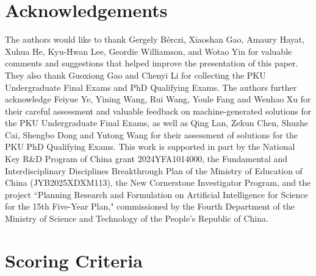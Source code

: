 \documentclass[11pt]{article}
\numberwithin{equation}{section}
\begin{document}
\section*{Acknowledgements}

The authors would like to thank Gergely Bérczi, Xiaoshan Gao, Amaury Hayat, Xuhua He, Kyu-Hwan Lee, Geordie Williamson, and Wotao Yin for valuable comments and suggestions that helped improve the presentation of this paper. They also thank Guoxiong Gao and Chenyi Li for collecting the PKU Undergraduate Final Exams and PhD Qualifying Exams. The authors further acknowledge Feiyue Ye, Yining Wang, Rui Wang, Youle Fang and Wenhao Xu for their careful assessment and valuable feedback on machine-generated solutions for the PKU Undergraduate Final Exams, as well as Qing Lan, Zekun Chen, Shuzhe Cai, Shengbo Dong and Yutong Wang for their assessment of solutions for the PKU PhD Qualifying Exams. This work is supported in part by the National Key R\&D Program of China grant 2024YFA1014000, the Fundamental and Interdisciplinary Disciplines Breakthrough Plan of the Ministry of Education of China (JYB2025XDXM113), the New Cornerstone Investigator Program, and the project ``Planning Research and Formulation on Artificial Intelligence for Science for the 15th Five-Year Plan," commissioned by the Fourth Department of the Ministry of Science and Technology of the People's Republic of China.









\newpage
\appendix

\section{Scoring Criteria}
\end{document}
